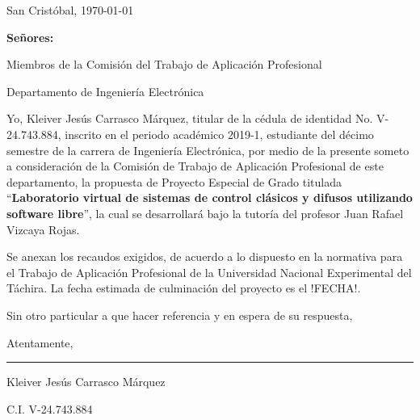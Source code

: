 \begin{titlepage}
\setcounter{page}{2}
\setlength{\parindent}{1.5cm}					%
\setlength{\parskip}{0pt}						%

\begin{flushright}
	San Cristóbal, \today
\end{flushright}

\vspace{1cm}
\vfill

\begin{flushleft}
		\singlespacing
		\setlength{\parskip}{0pt}
		
		\textbf{Señores:}
		
		Miembros de la Comisión del Trabajo de Aplicación Profesional
		
		Departamento de Ingeniería Electrónica
		
\end{flushleft}

\vfill
\begin{spacing}{1.5}
	Yo, Kleiver Jesús Carrasco Márquez, titular de la cédula de identidad No. \mbox{V-24.743.884}, inscrito en el periodo académico 2019-1, estudiante del décimo semestre de la carrera de Ingeniería Electrónica, por medio de la presente someto a consideración de la Comisión de Trabajo de Aplicación Profesional de este departamento, la propuesta de Proyecto Especial de Grado titulada \enquote{\textbf{Laboratorio virtual de sistemas de control clásicos y difusos utilizando software libre}}, la cual se desarrollará bajo la tutoría del profesor Juan Rafael Vizcaya Rojas.
	
	Se anexan los recaudos exigidos, de acuerdo a lo dispuesto en la normativa para el Trabajo de Aplicación Profesional de la Universidad Nacional Experimental del Táchira. La fecha estimada de culminación del proyecto es el \colorbox{resaltado}{!FECHA!}.
	
	Sin otro particular a que hacer referencia y en espera de su respuesta,
	
	\setlength{\parskip}{20pt} 
	
	\noindent Atentamente,
\end{spacing}

\vfill

\begin{center}
	
	\rule{6cm}{1pt}
	
	\vspace{0.2cm}
	
	Kleiver Jesús Carrasco Márquez
	
	\setlength{\parskip}{0pt}
	
	C.I. V-24.743.884
\end{center}

\vspace{0.5cm}
\end{titlepage}